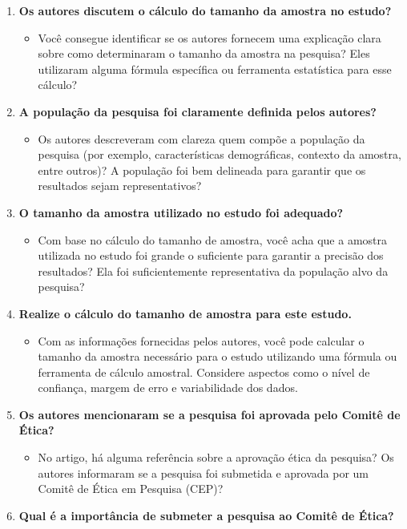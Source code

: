 \documentclass[
]{book}
\providecommand{\tightlist}{%
  \setlength{\itemsep}{0pt}\setlength{\parskip}{0pt}}
\begin{document}
\begin{enumerate}
\def\labelenumi{\arabic{enumi}.}
\tightlist
\item
  \textbf{Os autores discutem o cálculo do tamanho da amostra no estudo?}

  \begin{itemize}
  \tightlist
  \item
    Você consegue identificar se os autores fornecem uma explicação clara sobre como determinaram o tamanho da amostra na pesquisa? Eles utilizaram alguma fórmula específica ou ferramenta estatística para esse cálculo?
  \end{itemize}
\item
  \textbf{A população da pesquisa foi claramente definida pelos autores?}

  \begin{itemize}
  \tightlist
  \item
    Os autores descreveram com clareza quem compõe a população da pesquisa (por exemplo, características demográficas, contexto da amostra, entre outros)? A população foi bem delineada para garantir que os resultados sejam representativos?
  \end{itemize}
\item
  \textbf{O tamanho da amostra utilizado no estudo foi adequado?}

  \begin{itemize}
  \tightlist
  \item
    Com base no cálculo do tamanho de amostra, você acha que a amostra utilizada no estudo foi grande o suficiente para garantir a precisão dos resultados? Ela foi suficientemente representativa da população alvo da pesquisa?
  \end{itemize}
\item
  \textbf{Realize o cálculo do tamanho de amostra para este estudo.}

  \begin{itemize}
  \tightlist
  \item
    Com as informações fornecidas pelos autores, você pode calcular o tamanho da amostra necessário para o estudo utilizando uma fórmula ou ferramenta de cálculo amostral. Considere aspectos como o nível de confiança, margem de erro e variabilidade dos dados.
  \end{itemize}
\item
  \textbf{Os autores mencionaram se a pesquisa foi aprovada pelo Comitê de Ética?}

  \begin{itemize}
  \tightlist
  \item
    No artigo, há alguma referência sobre a aprovação ética da pesquisa? Os autores informaram se a pesquisa foi submetida e aprovada por um Comitê de Ética em Pesquisa (CEP)?
  \end{itemize}
\item
  \textbf{Qual é a importância de submeter a pesquisa ao Comitê de Ética?}


\end{enumerate}
\end{document}
